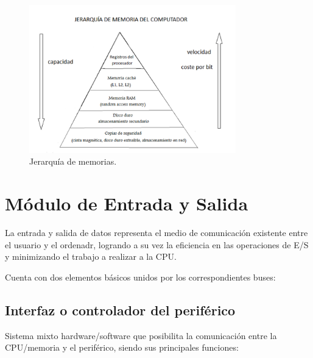 \documentclass[a4paper, 11pt, titlepage]{article}
\begin{document}
        \begin{figure}[htp]
            \centering
            \includegraphics[width=0.8\textwidth]{resources/jerarquiamemoria.png}
            \caption{Jerarquía de memorias.}
            \label{jerarquiamemoria}
        \end{figure}

\section{Módulo de Entrada y Salida}\label{entradasalida}

    La entrada y salida de datos representa el medio de comunicación existente entre el usuario y el 
    ordenadr, logrando a su vez la eficiencia en las operaciones de E/S y minimizando el trabajo a 
    realizar a la CPU.

    Cuenta con dos elementos básicos unidos por los correspondientes buses:

    \subsection{Interfaz o controlador del periférico}

        Sistema mixto hardware/software que posibilita la comunicación entre la CPU/memoria y el 
        periférico, siendo sus principales funciones:
\end{document}
